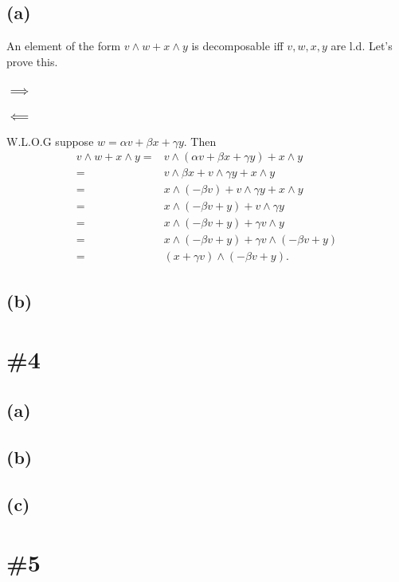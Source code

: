 \documentclass{article}
\begin{document}
\subsection*{(a)}
An element of the form $v\wedge w +x\wedge y$ is decomposable iff $v,w,x,y$ are l.d. Let's prove this.
\subsubsection*{$\implies$}
\subsubsection*{$\impliedby$}
W.L.O.G suppose $w=\alpha v+\beta x+\gamma y$. Then
\begin{align*}
	v\wedge w + x\wedge y =&
	v\wedge(\alpha v + \beta x + \gamma y) + x\wedge y\\
	=& v\wedge\beta x + v\wedge\gamma y + x\wedge y\\
	=& x\wedge(-\beta v) + v\wedge\gamma y + x\wedge y\\
	=& x\wedge(-\beta v+y) + v\wedge\gamma y \\
	=& x\wedge(-\beta v+y) + \gamma v\wedge y \\
	=& x\wedge(-\beta v+y) + \gamma v\wedge(-\beta v + y) \\
	=& (x+\gamma v)\wedge(-\beta v+y).
\end{align*}

\subsection*{(b)}

\section*{\#4}
\subsection*{(a)}
\subsection*{(b)}
\subsection*{(c)}
\section*{\#5}
\end{document}
